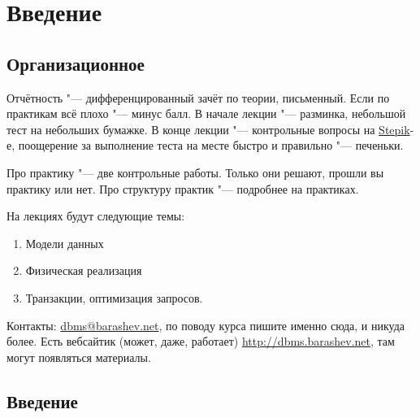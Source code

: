 \chapter{Введение}

\section{Организационное}

Отчётность "--- дифференцированный зачёт по теории, письменный.
Если по практикам всё плохо "--- минус балл.
В начале лекции "--- разминка, небольшой тест на небольших бумажке.
В конце лекции "--- контрольные вопросы на \href{http://goo.gl/ptnYrW}{Stepik}-е, поощерение за выполнение теста на месте быстро и правильно "--- печеньки.

Про практику "--- две контрольные работы.
Только они решают, прошли вы практику или нет.
Про структуру практик "--- подробнее на практиках.

На лекциях будут следующие темы:
\begin{enumerate}
	\item Модели данных
	\item Физическая реализация
	\item Транзакции, оптимизация запросов.
\end{enumerate}

Контакты: \href{mailto:dbms@barashev.net}{dbms@barashev.net}, по поводу курса пишите именно сюда, и никуда более.
Есть вебсайтик (может, даже, работает) \url{http://dbms.barashev.net}, там могут появляться материалы.

\section{Введение}

